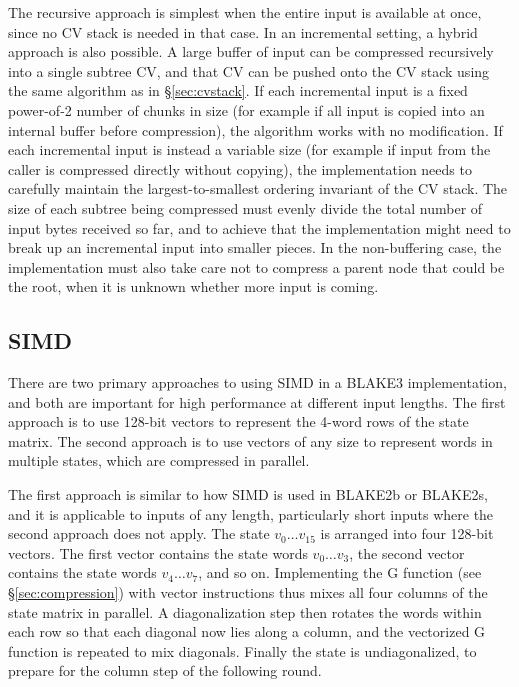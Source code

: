 \documentclass[11pt,notitlepage,a4paper]{article}
\begin{document}
The recursive approach is simplest when the entire input is available at once,
since no CV stack is needed in that case. In an incremental setting, a hybrid
approach is also possible. A large buffer of input can be compressed
recursively into a single subtree CV, and that CV can be pushed onto the CV
stack using the same algorithm as in \S\ref{sec:cvstack}. If each incremental
input is a fixed power-of-2 number of chunks in size (for example if all input
is copied into an internal buffer before compression), the algorithm works with
no modification. If each incremental input is instead a variable size (for
example if input from the caller is compressed directly without copying), the
implementation needs to carefully maintain the largest-to-smallest ordering
invariant of the CV stack. The size of each subtree being compressed must
evenly divide the total number of input bytes received so far, and to achieve
that the implementation might need to break up an incremental input into
smaller pieces. In the non-buffering case, the implementation must also take
care not to compress a parent node that could be the root, when it is unknown
whether more input is coming.

\subsection{SIMD}\label{sec:simd}

There are two primary approaches to using SIMD in a BLAKE3 implementation, and both are
important for high performance at different input lengths. The first approach
is to use 128-bit vectors to represent the 4-word rows of the state matrix. The
second approach is to use vectors of any size to represent words in multiple
states, which are compressed in parallel.

The first approach is similar to how SIMD is used in BLAKE2b or BLAKE2s, and it
is applicable to inputs of any length, particularly short inputs where the
second approach does not apply. The state $v_0 \ldots v_{15}$ is arranged into
four 128-bit vectors. The first vector contains the state words $v_0 \ldots
v_3$, the second vector contains the state words $v_4 \ldots v_7$, and so on.
Implementing the G function (see \S\ref{sec:compression}) with vector
instructions thus mixes all four columns of the state matrix in parallel. A
diagonalization step then rotates the words within each row so that each
diagonal now lies along a column, and the vectorized G function is repeated to
mix diagonals. Finally the state is undiagonalized, to prepare for the column
step of the following round.
\end{document}
